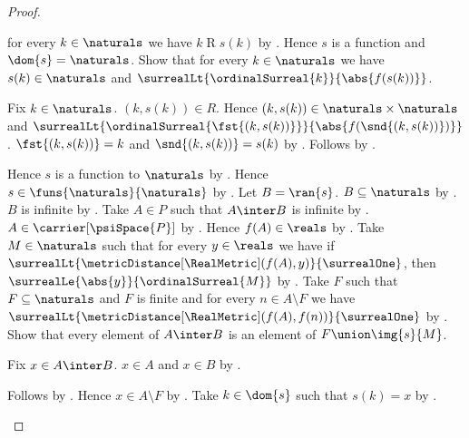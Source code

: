 \begin{proof}
\begin{subproof}
            for every $k\in\naturals$ we have $k\mathrel{R}s(k)$
            by .
        Hence $s$ is a function and $\dom{s}=\naturals$.
        Show that for every $k\in\naturals$ we have
            $s(k)\in\naturals$ and
            $\surrealLt{\ordinalSurreal{k}}{\abs{f(s(k))}}$.
        \begin{subproof}
            Fix $k\in\naturals$.
            $(k,s(k))\in R$.
            Hence $(k,s(k))\in\naturals\times\naturals$ and
                $\surrealLt{\ordinalSurreal{\fst{(k,s(k))}}}
                    {\abs{f(\snd{(k,s(k))})}}$.
            $\fst{(k,s(k))}=k$ and $\snd{(k,s(k))}=s(k)$ by
                .
            Follows by .
        \end{subproof}
        Hence $s$ is a function to $\naturals$ by \auto.
        Hence $s\in\funs{\naturals}{\naturals}$ by .
        Let $B=\ran{s}$.
        $B\subseteq\naturals$ by .
        $B$ is infinite by .
        Take $A\in P$ such that $A\inter B$ is infinite by
            .
        $A\in\carrier[\psiSpace{P}]$ by
            .
        Hence $f(A)\in\reals$ by
            .
        Take $M\in\naturals$ such that for every $y\in\reals$ we have if
            $\surrealLt{\metricDistance[\RealMetric](f(A),y)}
                {\surrealOne}$, then
            $\surrealLe{\abs{y}}{\ordinalSurreal{M}}$ by
            .
        Take $F$ such that $F\subseteq\naturals$ and $F$ is finite and
            for every $n\in A\setminus F$ we have
                $\surrealLt{\metricDistance[\RealMetric](f(A),f(n))}
                    {\surrealOne}$ by
            .
        Show that every element of $A\inter B$ is an element of
            $F\union\img{s}{M}$.
        \begin{subproof}
            Fix $x\in A\inter B$.
            $x\in A$ and $x\in B$ by .
            \begin{byCase}
                    Follows by .
                    Hence $x\in A\setminus F$ by .
                    Take $k\in\dom{s}$ such that $s(k)=x$ by
                        .

\end{byCase}
\end{subproof}
\end{subproof}
\end{proof}
